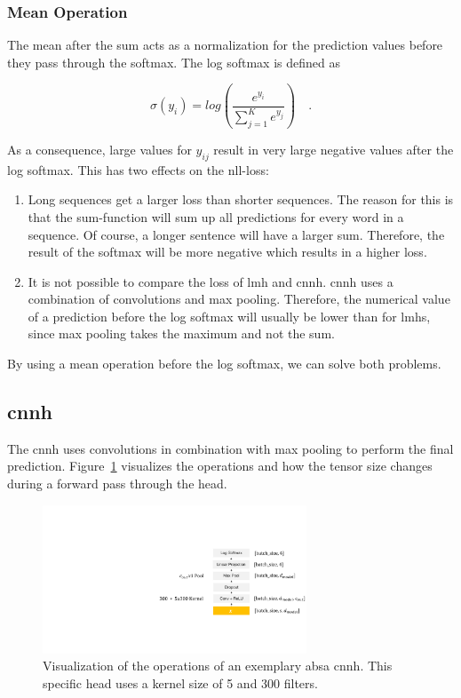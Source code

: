 \subsubsection*{Mean Operation}

The mean after the sum acts as a normalization for the prediction values before they pass through the softmax. The log softmax is defined as 

\begin{equation}
    \sigma(y_i)=log(\frac{e^{y_i}}{\sum_{j=1}^{K}e^{y_j}})\quad .
\end{equation}

As a consequence, large values for $y_{ij}$ result in very large negative values after the log softmax. This has two effects on the \gls{nll}-loss:

\begin{enumerate}
    \item Long sequences get a larger loss than shorter sequences. The reason for this is that the sum-function will sum up all predictions for every word in a sequence. Of course, a longer sentence will have a larger sum. Therefore, the result of the softmax will be more negative which results in a higher loss.
    \item It is not possible to compare the loss of \gls{lmh} and \gls{cnnh}. \gls{cnnh} uses a combination of convolutions and max pooling. Therefore, the numerical value of a prediction before the log softmax will usually be lower than for \glspl{lmh}, since max pooling takes the maximum and not the sum.
\end{enumerate}

By using a mean operation before the log softmax, we can solve both problems.

\subsection{\acrfull{cnnh}}
The \acrfull{cnnh} uses convolutions in combination with max pooling to perform the final prediction. Figure~\ref{fig:04_ch1} visualizes the operations and how the tensor size changes during a forward pass through the head. 
\medskip
\begin{figure}[htp]
    \centering
    \includegraphics[width=0.7\textwidth]{figures/04_method/04_ch}
    \caption{Visualization of the operations of an exemplary \gls{absa} \acrfull{cnnh}. This specific head uses a kernel size of 5 and 300 filters.}
    \label{fig:04_ch1}
\end{figure}


